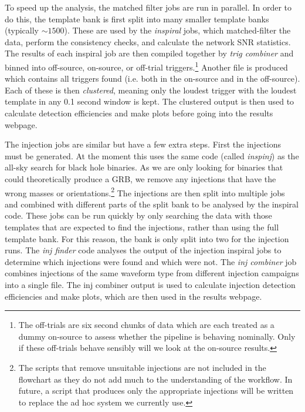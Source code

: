 \documentclass[11pt]{cuthesis}
\begin{document}
To speed up the analysis, the matched filter jobs are run in parallel. In order to do this, the template bank is first split into many smaller template banks (typically $\sim1500$). These are used by the \textit{inspiral} jobs, which matched-filter the data, perform the consistency checks, and calculate the network SNR statistics. The results of each inspiral job are then compiled together by \textit{trig combiner} and binned into off-source, on-source, or off-trial triggers.\footnote{The off-trials are six second chunks of data which are each treated as a dummy on-source to assess whether the pipeline is behaving nominally. Only if these off-trials behave sensibly will we look at the on-source results.} Another file is produced which contains all triggers found (i.e. both in the on-source and in the off-source). Each of these is then \textit{clustered}, meaning only the loudest trigger with the loudest template in any 0.1 second window is kept. The clustered output is then used to calculate detection efficiencies and make plots before going into the results webpage. 

The injection jobs are similar but have a few extra steps. First the injections must be generated. At the moment this uses the same code (called \textit{inspinj}) as the all-sky search for black hole binaries. As we are only looking for binaries that could theoretically produce a GRB, we remove any injections that have the wrong masses or orientations.\footnote{The scripts that remove unsuitable injections are not included in the flowchart as they do not add much to the understanding of the workflow. In future, a script that produces only the appropriate injections will be written to replace the ad hoc system we currently use.} The injections are then split into multiple jobs and combined with different parts of the split bank to be analysed by the inspiral code. These jobs can be run quickly by only searching the data with those templates that are expected to find the injections, rather than using the full template bank. For this reason, the bank is only split into two for the injection runs. The \textit{inj finder} code analyses the output of the injection inspiral jobs to determine which injections were found and which were not. The \textit{inj combiner} job combines injections of the same waveform type from different injection campaigns into a single file. The inj combiner output is used to calculate injection detection efficiencies and make plots, which are then used in the results webpage. 
\end{document}
